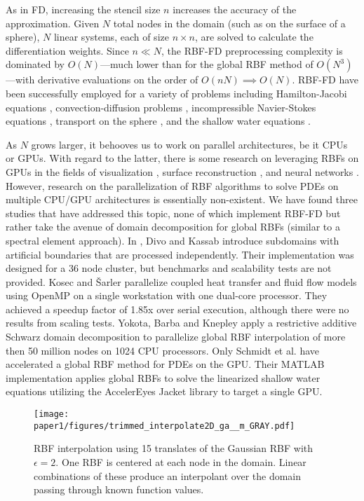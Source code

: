As in FD, increasing the stencil size $n$  increases the accuracy of the approximation.
Given $N$ total nodes in the domain (such as on the surface of a sphere), $N$ linear systems, each of size $n \times n$, are solved to calculate the differentiation weights. Since $n \ll N$, the RBF-FD preprocessing complexity is dominated by $O(N)$---much lower than for the global RBF method of $O(N^3)$---with derivative evaluations on the order of $O(nN) \implies O(N)$. RBF-FD have been successfully employed for a variety of problems including Hamilton-Jacobi equations \cite{Cecil2004}, convection-diffusion problems \cite{Chandhini2007, Stevens2009b},
incompressible Navier-Stokes equations \cite{Shu2003,Chinchapatnam2009}, transport on the sphere \cite{FornbergLehto11}, and the shallow water equations \cite{FlyerLehto11}.

As $N$ grows larger, it behooves us to work on parallel architectures, be it CPUs or GPUs. With regard to the latter, there is some research on leveraging RBFs on GPUs in the fields of visualization \cite{Cuntz2007,Weiler2005},  surface reconstruction \cite{Corrigan2005,Carr2003}, and neural networks \cite{Brandstetter2008}. However, research on the parallelization of RBF algorithms to solve PDEs on multiple CPU/GPU architectures is essentially non-existent. We have found three studies that have addressed this topic, none of which implement RBF-FD but rather take the avenue of domain decomposition for global RBFs (similar to a spectral element approach). In \cite{Divo2007}, Divo and Kassab introduce subdomains with artificial boundaries that are processed independently. Their implementation was designed for a 36 node cluster, but benchmarks and scalability tests are not provided. Kosec and \v{S}arler \cite{Kosec2008} parallelize coupled heat transfer and fluid flow models using OpenMP on a single workstation with one dual-core processor. They achieved a speedup factor of 1.85x over serial execution, although there were
no results from scaling tests. Yokota, Barba and Knepley \cite{Yokota2010} apply a restrictive additive Schwarz domain decomposition to parallelize global RBF interpolation of more then 50 million nodes on 1024 CPU processors. Only Schmidt et al. \cite{Schmidt2009b} have accelerated a global RBF method for PDEs on the GPU. Their MATLAB implementation applies global RBFs to solve the linearized shallow water equations utilizing the AccelerEyes Jacket \cite{JacketGuide2009} library to target a single GPU.

\begin{figure}[t]
    \centering
    \texttt{[image: paper1/figures/trimmed\_interpolate2D\_ga\_\_m\_GRAY.pdf]}
    \caption{RBF interpolation using 15 translates of the Gaussian RBF with $\epsilon=2$. One RBF is centered at each node in the domain. Linear
    combinations of these produce an interpolant over the domain passing through known function values. }
    \label{fig:rbfInterpolation}
\end{figure}

